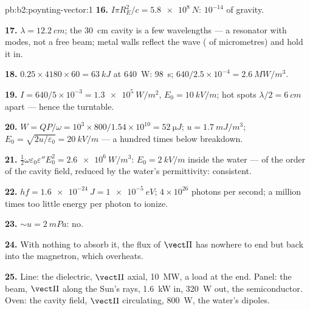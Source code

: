\begin{solution}{pb:b2:poynting-vector:1}
\textbf{16.} $I\pi R_E^2/c = \qty{5.8e8}{N}$: $10^{-14}$ of gravity.

\textbf{17.} $\lambda = \qty{12.2}{cm}$; the \qty{30}{cm} cavity is a few wavelengths
--- a resonator with modes, not a free beam; metal walls reflect the
wave ( of micrometres) and hold it in.

\textbf{18.} $0.25 \times 4180 \times 60 = \qty{63}{kJ}$ at \qty{640}{W}: \qty{98}{s};
$640/2.5 \times 10^{-4} = \qty{2.6}{MW/m^3}$.

\textbf{19.} $I = 640/5 \times 10^{-3} = \qty{1.3e5}{W/m^2}$, $E_0 = \qty{10}{kV/m}$; hot spots
$\lambda/2 = \qty{6}{cm}$ apart --- hence the turntable.

\textbf{20.} $W = QP/\omega = 10^3 \times 800/1.54 \times 10^{10} = \qty{52}{\micro J}$; $u =
\qty{1.7}{mJ/m^3}$; $E_0 = \sqrt{2u/\varepsilon_0} = \qty{20}{kV/m}$ --- a hundred times below
breakdown.

\textbf{21.} $\tfrac12\omega\varepsilon_0\varepsilon''E_0^2 = \qty{2.6e6}{W/m^3}$: $E_0 = \qty{2}{kV/m}$
inside the water --- of the order of the cavity field, reduced by the
water's permittivity: consistent.

\textbf{22.} $hf = \qty{1.6e-24}{J} = \qty{1e-5}{eV}$; $4 \times 10^{26}$ photons per second;
a million times too little energy per photon to ionize.

\textbf{23.} $\sim u = \qty{2}{mPa}$: no.

\textbf{24.} With nothing to absorb it, the flux of $\vect\Pi$ has
nowhere to end but back into the magnetron, which overheats.

\textbf{25.} Line: the dielectric, $\vect\Pi$ axial, \qty{10}{MW}, a load at
the end. Panel: the beam, $\vect\Pi$ along the Sun's rays, \qty{1.6}{kW}
in, \qty{320}{W} out, the semiconductor. Oven: the cavity field, $\vect\Pi$
circulating, \qty{800}{W}, the water's dipoles.
\end{solution}
